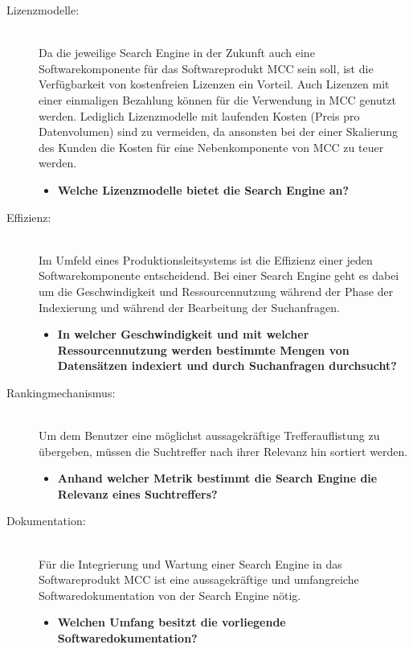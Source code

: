 \begin{description}
    \item[Lizenzmodelle:]\hfill \\
    Da die jeweilige Search Engine in der Zukunft auch eine Softwarekomponente für das Softwareprodukt MCC sein soll, ist die Verfügbarkeit von kostenfreien Lizenzen ein Vorteil. Auch Lizenzen mit einer einmaligen Bezahlung können für die Verwendung in MCC genutzt werden. Lediglich Lizenzmodelle mit laufenden Kosten (Preis pro Datenvolumen) sind zu vermeiden, da ansonsten bei der einer Skalierung des Kunden die Kosten für eine Nebenkomponente von MCC zu teuer werden.
    
    \begin{itemize}
        \item \textbf{Welche Lizenzmodelle bietet die Search Engine an?}
    \end{itemize}

    \item[Effizienz:]\hfill \\
    Im Umfeld eines Produktionsleitsystems ist die Effizienz einer jeden Softwarekomponente entscheidend. Bei einer Search Engine geht es dabei um die Geschwindigkeit und Ressourcennutzung während der Phase der Indexierung und während der Bearbeitung der Suchanfragen.

    \begin{itemize}
        \item \textbf{In welcher Geschwindigkeit und mit welcher Ressourcennutzung werden bestimmte Mengen von Datensätzen indexiert und durch Suchanfragen durchsucht?}
    \end{itemize}
    
    \item[Rankingmechanismus:]\hfill \\
    Um dem Benutzer eine möglichst aussagekräftige Trefferauflistung zu übergeben, müssen die Suchtreffer nach ihrer Relevanz hin sortiert werden.

    \begin{itemize}
        \item \textbf{Anhand welcher Metrik bestimmt die Search Engine die Relevanz eines Suchtreffers?}
    \end{itemize}

    \item[Dokumentation:]\hfill \\
    Für die Integrierung und Wartung einer Search Engine in das Softwareprodukt MCC ist eine aussagekräftige und umfangreiche Softwaredokumentation von der Search Engine nötig.

    \begin{itemize}
        \item \textbf{Welchen Umfang besitzt die vorliegende Softwaredokumentation?}
    \end{itemize}

\end{description}

